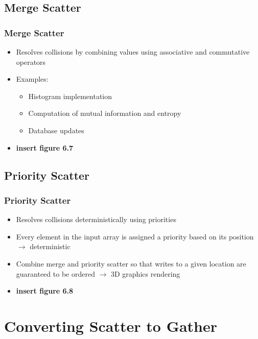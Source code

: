 \documentclass[xcolor=dvipsnames]{beamer}
\begin{document}
		\subsection*{Merge Scatter}
		\begin{frame} \frametitle{Merge Scatter}
			\begin{itemize}
				\item Resolves collisions by combining values using associative and commutative operators
				\item Examples:
					\begin{itemize}
						\item Histogram implementation
						\item Computation of mutual information and entropy
						\item Database updates
					\end{itemize}
				\item \textbf{insert figure 6.7}
			\end{itemize}
		\end{frame}
	
		\subsection*{Priority Scatter}
		\begin{frame} \frametitle{Priority Scatter}
			\begin{itemize}
				\item Resolves collisions deterministically using priorities
				\item Every element in the input array is assigned a priority based on its position $\rightarrow$ deterministic
				\item Combine merge and priority scatter so that writes to a given location are guaranteed to be ordered $\rightarrow$ 3D graphics rendering
				\item \textbf{insert figure 6.8}
			\end{itemize}
		\end{frame}


\section{Converting Scatter to Gather} 
\end{document}
